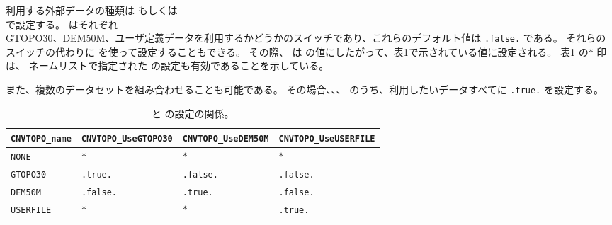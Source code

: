 利用する外部データの種類は  もしくは \\  で設定する。
 はそれぞれ \\ GTOPO30、DEM50M、ユーザ定義データを利用するかどうかのスイッチであり、これらのデフォルト値は \verb|.false.| である。
それらのスイッチの代わりに  を使って設定することもできる。
その際、 は の値にしたがって、表\ref{tab:cvntopo_name}で示されている値に設定される。
表\ref{tab:cvntopo_name} の$\ast$ 印は、
ネームリストで指定された の設定も有効であることを示している。

また、複数のデータセットを組み合わせることも可能である。
その場合、、、 のうち、利用したいデータすべてに \verb|.true.| を設定する。

\begin{table}[tbh]
\begin{center}
\caption{ と  の設定の関係。}
\begin{tabularx}{150mm}{l|l|l|l} \hline
  \rowcolor[gray]{0.9} \verb|CNVTOPO_name|   & \verb|CNVTOPO_UseGTOPO30| & \verb|CNVTOPO_UseDEM50M| & \verb|CNVTOPO_UseUSERFILE| \\ \hline
                       \verb|NONE|           & $\ast$         & $\ast$         & $\ast$          \\ \hline
                       \verb|GTOPO30|        & \verb|.true.|  & \verb|.false.| & \verb|.false.|  \\ \hline
                       \verb|DEM50M|         & \verb|.false.| & \verb|.true.|  & \verb|.false.|  \\ \hline
                       \verb|USERFILE|       & $\ast$         & $\ast$         & \verb|.true.|   \\ \hline
\end{tabularx}
\label{tab:cvntopo_name}
\end{center}
\end{table}



